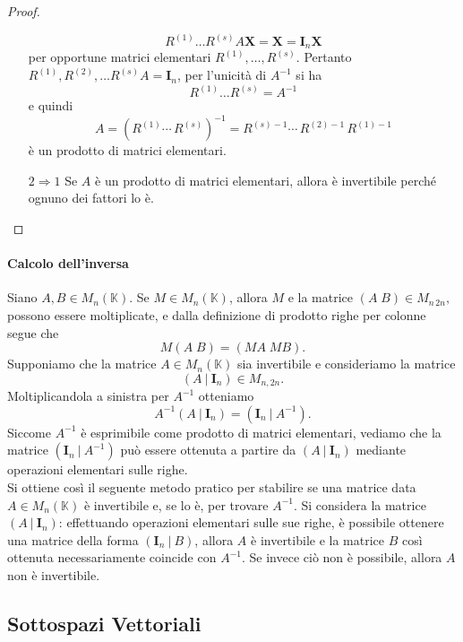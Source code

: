 \documentclass{article}
\theoremstyle{plain}
\theoremstyle{definition}
\theoremstyle{remark}
\begin{document}
\begin{proof}
\begin{itemize}
        \[
            R^{(1)} \ldots R^{(s)}A\mathbf{X} = \mathbf{X} = \mathbf{I}_n\mathbf{X}
        \]
        per opportune matrici elementari \( R^{(1)}, \ldots, R^{(s)} \).        
        Pertanto \( R^{(1)}, R^{(2)}, \ldots R^{(s)}A = \mathbf{I}_n \), per l'unicità di \( A^{-1} \) si ha 
        \[ R^{(1)} \ldots R^{(s)} = A^{-1} \] e quindi
        \[
            A = (R^{(1)} \cdots\, R^{(s)})^{-1} = R^{(s)-1} \cdots\, R^{(2)-1}\, R^{(1)-1}
        \]
        è un prodotto di matrici elementari.
        \item[$2\Rightarrow 1$]
        Se \( A \) è un prodotto di matrici elementari, allora è invertibile perché ognuno dei fattori lo è.
    \end{itemize}
\end{proof}

\vspace{10pt}

\paragraph{Calcolo dell'inversa}
Siano \( A, B \in M_n(\mathbb{K}) \). Se \( M \in M_n(\mathbb{K}) \), allora \( M \) e la matrice \( (A \; B) \in M_{n\,2n}, \) possono essere moltiplicate, e dalla definizione di prodotto righe per colonne segue che
\[
    M(A \; B) = (MA \; MB).
\]
Supponiamo che la matrice \( A \in M_n(\mathbb{K}) \) sia invertibile e consideriamo la matrice \[ (A \ | \ \mathbf{I}_n) \in M_{n, 2n}. \]
Moltiplicandola a sinistra per \( A^{-1} \) otteniamo
\[
A^{-1}(A \ | \ \mathbf{I}_n) = (\mathbf{I}_n \ | \ A^{-1}).
\]
Siccome \( A^{-1} \) è esprimibile come prodotto di matrici elementari, vediamo che la matrice \( (\mathbf{I}_n \ | \ A^{-1}) \) può essere ottenuta a partire da \( (A \ | \ \mathbf{I}_n) \) mediante operazioni elementari sulle righe.\\
Si ottiene così il seguente metodo pratico per stabilire se una matrice data \( A \in M_n(\mathbb{K}) \) è invertibile e, se lo è, per trovare \( A^{-1} \). 
Si considera la matrice \( (A \ | \ \mathbf{I}_n) \): effettuando operazioni elementari sulle sue righe, è possibile ottenere una matrice della forma \( (\mathbf{I}_n \ |\  B) \), allora \( A \) è invertibile e la matrice \( B \) così ottenuta necessariamente coincide con \( A^{-1} \). 
Se invece ciò non è possibile, allora \( A \) non è invertibile.

\newpage
\subsection{Sottospazi Vettoriali}
\vspace{20pt}
\end{document}
